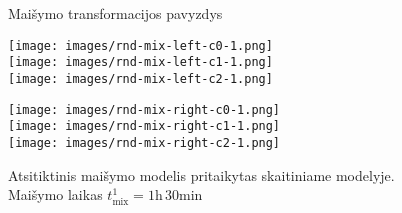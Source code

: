 \begin{figure}[!h]
\centering
\label{split-reaction-space}

\caption{Maišymo transformacijos pavyzdys}
\end{figure}

\begin{figure}[h]
    \centering
    \begin{minipage}[c]{0.40\textwidth}
        \centering
        \texttt{[image: images/rnd-mix-left-c0-1.png]}\\
        \texttt{[image: images/rnd-mix-left-c1-1.png]}\\
        \texttt{[image: images/rnd-mix-left-c2-1.png]}
    \end{minipage}%
    \hfill
    \begin{minipage}[c]{0.1\textwidth}
        \centering
    \end{minipage}%
    \hfill
    \begin{minipage}[c]{0.45\textwidth}
        \centering
        \texttt{[image: images/rnd-mix-right-c0-1.png]}\\
        \texttt{[image: images/rnd-mix-right-c1-1.png]}\\
        \texttt{[image: images/rnd-mix-right-c2-1.png]}
    \end{minipage}

    \caption{Atsitiktinis maišymo modelis pritaikytas skaitiniame modelyje. Maišymo laikas $t^1_\text{mix} = 1\text{h}\,30\text{min}$ }

    \label{fig:random-mix-example}

\end{figure}

